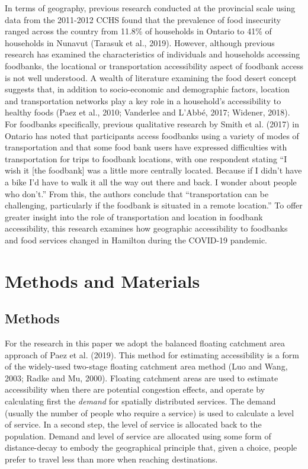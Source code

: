 \documentclass[]{elsarticle} %
\begin{document}
In terms of geography, previous research conducted at the provincial
scale using data from the 2011-2012 CCHS found that the prevalence of
food insecurity ranged across the country from 11.8\% of households in
Ontario to 41\% of households in Nunavut (Tarasuk et al., 2019).
However, although previous research has examined the characteristics of
individuals and households accessing foodbanks, the locational or
transportation accessibility aspect of foodbank access is not well
understood. A wealth of literature examining the food desert concept
suggests that, in addition to socio-economic and demographic factors,
location and transportation networks play a key role in a household's
accessibility to healthy foods (Paez et al., 2010; Vanderlee and L'Abbé,
2017; Widener, 2018). For foodbanks specifically, previous qualitative
research by Smith et al. (2017) in Ontario has noted that participants
access foodbanks using a variety of modes of transportation and that
some food bank users have expressed difficulties with transportation for
trips to foodbank locations, with one respondent stating ``I wish it
{[}the foodbank{]} was a little more centrally located. Because if I
didn't have a bike I'd have to walk it all the way out there and back. I
wonder about people who don't.'' From this, the authors conclude that
``transportation can be challenging, particularly if the foodbank is
situated in a remote location.'' To offer greater insight into the role
of transportation and location in foodbank accessibility, this research
examines how geographic accessibility to foodbanks and food services
changed in Hamilton during the COVID-19 pandemic.

\hypertarget{methods-and-materials}{%
\section{Methods and Materials}\label{methods-and-materials}}

\hypertarget{methods}{%
\subsection{Methods}\label{methods}}

For the research in this paper we adopt the balanced floating catchment
area approach of Paez et al. (2019). This method for estimating
accessibility is a form of the widely-used two-stage floating catchment
area method (Luo and Wang, 2003; Radke and Mu, 2000). Floating catchment
areas are used to estimate accessibility when there are potential
congestion effects, and operate by calculating first the \emph{demand}
for spatially distributed services. The demand (usually the number of
people who require a service) is used to calculate a level of service.
In a second step, the level of service is allocated back to the
population. Demand and level of service are allocated using some form of
distance-decay to embody the geographical principle that, given a
choice, people prefer to travel less than more when reaching
destinations.
\end{document}
